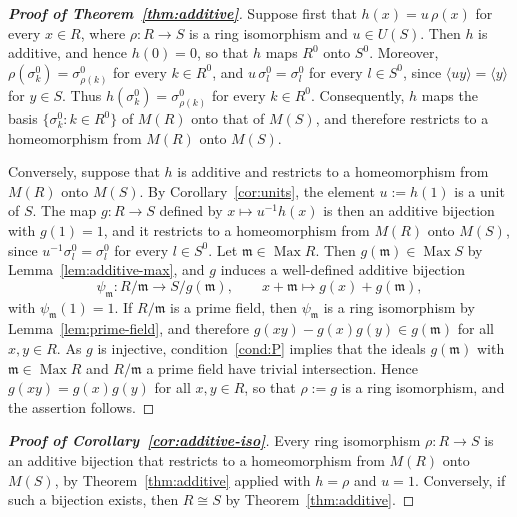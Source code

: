 \documentclass[12pt,reqno,a4paper]{amsart}
\newcommand{\m}{\mathfrak{m}}
\DeclareMathOperator{\Max}{Max}
\theoremstyle{plain}
\theoremstyle{definition}
\begin{document}
\begin{proof}[\normalfont\bfseries Proof of Theorem~\ref{thm:additive}]
Suppose first that $h(x)=u\,\rho(x)$ for every $x\in R$, where $\rho\colon R\to S$ is a ring isomorphism and $u\in U(S)$. Then $h$ is additive, and hence $h(0)=0$, so that $h$ maps $R^0$ onto $S^0$. Moreover, $\rho(\sigma_k^0)=\sigma_{\rho(k)}^0$ for every $k\in R^0$, and $u\,\sigma_l^0=\sigma_l^0$ for every $l\in S^0$, since $\langle uy\rangle=\langle y\rangle$ for $y\in S$. Thus $h(\sigma_k^0)=\sigma_{\rho(k)}^0$ for every $k\in R^0$. Consequently, $h$ maps the basis $\{\sigma_k^0:k\in R^0\}$ of $M(R)$ onto that of $M(S)$, and therefore restricts to a homeomorphism from $M(R)$ onto $M(S)$.

Conversely, suppose that $h$ is additive and restricts to a homeomorphism from $M(R)$ onto $M(S)$. By Corollary~\ref{cor:units}, the element $u:=h(1)$ is a unit of $S$. The map $g\colon R\to S$ defined by $x\mapsto u^{-1}h(x)$ is then an additive bijection with $g(1)=1$, and it restricts to a homeomorphism from $M(R)$ onto $M(S)$, since $u^{-1}\sigma_l^0=\sigma_l^0$ for every $l\in S^0$. Let $\m\in\Max R$. Then $g(\m)\in\Max S$ by Lemma~\ref{lem:additive-max}, and $g$ induces a well-defined additive bijection
\[
\psi_\m\colon R/\m\to S/g(\m),\qquad x+\m\mapsto g(x)+g(\m),
\]
with $\psi_\m(1)=1$. If $R/\m$ is a prime field, then $\psi_\m$ is a ring isomorphism by Lemma~\ref{lem:prime-field}, and therefore $g(xy)-g(x)g(y)\in g(\m)$ for all $x,y\in R$. As $g$ is injective, condition~\ref{cond:P} implies that the ideals $g(\m)$ with $\m\in\Max R$ and $R/\m$ a prime field have trivial intersection. Hence $g(xy)=g(x)g(y)$ for all $x,y\in R$, so that $\rho:=g$ is a ring isomorphism, and the assertion follows.
\end{proof}
\begin{proof}[\normalfont\bfseries Proof of Corollary~\ref{cor:additive-iso}]
Every ring isomorphism $\rho\colon R\to S$ is an additive bijection that restricts to a homeomorphism from $M(R)$ onto $M(S)$, by Theorem~\ref{thm:additive} applied with $h=\rho$ and $u=1$. Conversely, if such a bijection exists, then $R\cong S$ by Theorem~\ref{thm:additive}.
\end{proof}
\end{document}
